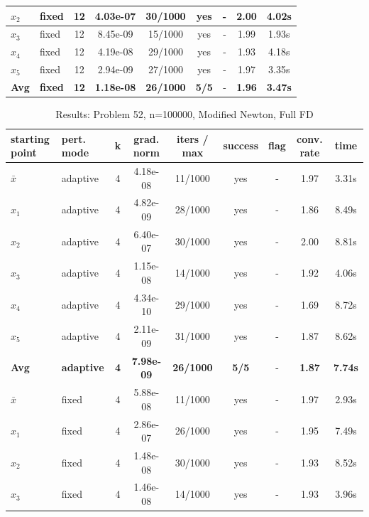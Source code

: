 \begin{longtable}{|l|l|c|c|c|c|c|c|c|}
\hline
$x_2$ & fixed & 12 & 4.03e-07 & 30/1000 & yes & - & 2.00 & 4.02s \\
\hline
$x_3$ & fixed & 12 & 8.45e-09 & 15/1000 & yes & - & 1.99 & 1.93s \\
\hline
$x_4$ & fixed & 12 & 4.19e-08 & 29/1000 & yes & - & 1.93 & 4.18s \\
\hline
$x_5$ & fixed & 12 & 2.94e-09 & 27/1000 & yes & - & 1.97 & 3.35s \\
\hline
\hline\hline
\textbf{Avg} & \textbf{fixed} & \textbf{12} & \textbf{1.18e-08} & \textbf{26/1000} & \textbf{5/5} & - & \textbf{1.96} & \textbf{3.47s} \\
\hline\hline
\end{longtable}


\begin{longtable}{|l|l|c|c|c|c|c|c|c|}
\caption{Results: Problem 52, n=100000, Modified Newton, Full FD} \\
\hline
\textbf{starting point} & \textbf{pert. mode} & \textbf{k} & \textbf{grad. norm} & \textbf{iters / max} & \textbf{success} & \textbf{flag} & \textbf{conv. rate} & \textbf{time} \\
\hline
\endfirsthead
\endhead
\endfoot
\hline
\endlastfoot
$\bar{x}$ & adaptive & 4 & 4.18e-08 & 11/1000 & yes & - & 1.97 & 3.31s \\
\hline
$x_1$ & adaptive & 4 & 4.82e-09 & 28/1000 & yes & - & 1.86 & 8.49s \\
\hline
$x_2$ & adaptive & 4 & 6.40e-07 & 30/1000 & yes & - & 2.00 & 8.81s \\
\hline
$x_3$ & adaptive & 4 & 1.15e-08 & 14/1000 & yes & - & 1.92 & 4.06s \\
\hline
$x_4$ & adaptive & 4 & 4.34e-10 & 29/1000 & yes & - & 1.69 & 8.72s \\
\hline
$x_5$ & adaptive & 4 & 2.11e-09 & 31/1000 & yes & - & 1.87 & 8.62s \\
\hline
\hline\hline
\textbf{Avg} & \textbf{adaptive} & \textbf{4} & \textbf{7.98e-09} & \textbf{26/1000} & \textbf{5/5} & - & \textbf{1.87} & \textbf{7.74s} \\
\hline\hline
\hline
$\bar{x}$ & fixed & 4 & 5.88e-08 & 11/1000 & yes & - & 1.97 & 2.93s \\
\hline
$x_1$ & fixed & 4 & 2.86e-07 & 26/1000 & yes & - & 1.95 & 7.49s \\
\hline
$x_2$ & fixed & 4 & 1.48e-08 & 30/1000 & yes & - & 1.93 & 8.52s \\
\hline
$x_3$ & fixed & 4 & 1.46e-08 & 14/1000 & yes & - & 1.93 & 3.96s \\

\end{longtable}
